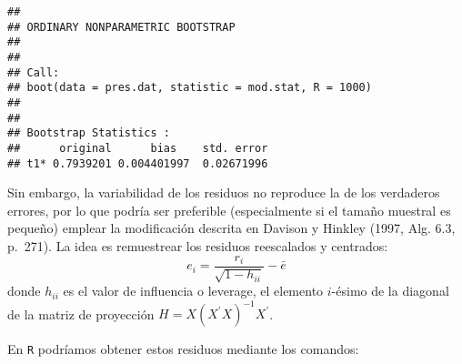 \documentclass[
]{book}
\newenvironment{Shaded}{\begin{snugshade}}{\end{snugshade}}
\newcommand{\ControlFlowTok}[1]{\textcolor[rgb]{0.13,0.29,0.53}{\textbf{#1}}}
\newcommand{\DataTypeTok}[1]{\textcolor[rgb]{0.13,0.29,0.53}{#1}}
\newcommand{\DecValTok}[1]{\textcolor[rgb]{0.00,0.00,0.81}{#1}}
\newcommand{\KeywordTok}[1]{\textcolor[rgb]{0.13,0.29,0.53}{\textbf{#1}}}
\newcommand{\NormalTok}[1]{#1}
\newcommand{\OperatorTok}[1]{\textcolor[rgb]{0.81,0.36,0.00}{\textbf{#1}}}
\newcommand{\StringTok}[1]{\textcolor[rgb]{0.31,0.60,0.02}{#1}}
\theoremstyle{definition}
\theoremstyle{definition}
\theoremstyle{definition}
\theoremstyle{remark}
\begin{document}
\begin{Shaded}
\end{Shaded}

\begin{verbatim}
## 
## ORDINARY NONPARAMETRIC BOOTSTRAP
## 
## 
## Call:
## boot(data = pres.dat, statistic = mod.stat, R = 1000)
## 
## 
## Bootstrap Statistics :
##      original      bias    std. error
## t1* 0.7939201 0.004401997  0.02671996
\end{verbatim}

Sin embargo, la variabilidad de los residuos no reproduce la de los
verdaderos errores, por lo que podría ser preferible (especialmente
si el tamaño muestral es pequeño) emplear la modificación descrita
en Davison y Hinkley (1997, Alg. 6.3, p.~271).
La idea es remuestrear los residuos reescalados y centrados:
\[e_i = \frac{r_i}{\sqrt{1 - h_{ii} }} - \bar{e}\]
donde \(h_{ii}\) es el valor de influencia o leverage,
el elemento \(i\)-ésimo de la diagonal de la matriz de proyección
\(H = X\left( X^{\prime }X\right)^{-1}X^{\prime }\).

En \texttt{R} podríamos obtener estos residuos mediante los comandos:

\begin{Shaded}
\end{Shaded}
\end{document}
